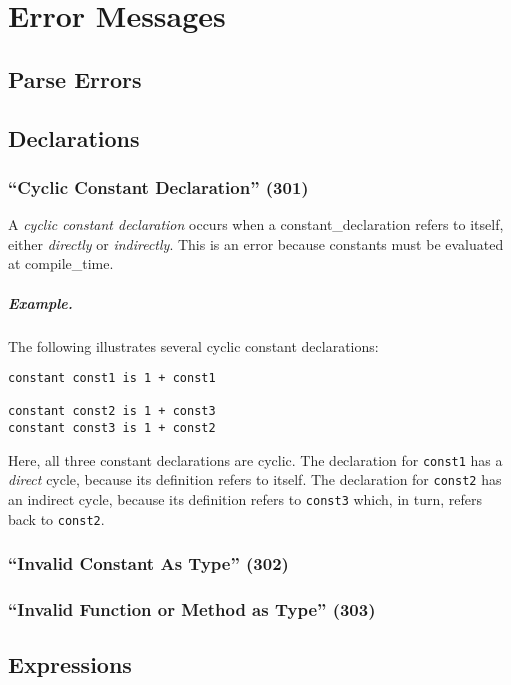 \chapter{Error Messages}

\section{Parse Errors}

\section{Declarations}

\subsection{``Cyclic Constant Declaration'' (301)}

A {\em cyclic constant declaration} occurs when a \gls{constant_declaration} refers to itself, either {\em directly} or {\em indirectly}.  This is an error because constants must be evaluated at \gls{compile_time}.

\paragraph{Example.}  The following illustrates several cyclic constant declarations:

\begin{lstlisting}
constant const1 is 1 + const1

constant const2 is 1 + const3
constant const3 is 1 + const2
\end{lstlisting}
Here, all three constant declarations are cyclic.  The declaration for \lstinline{const1} has a {\em direct} cycle, because its definition refers to itself.  The declaration for \lstinline{const2} has an indirect cycle, because its definition refers to \lstinline{const3} which, in turn, refers back to \lstinline{const2}.

\subsection{``Invalid Constant As Type'' (302)}

\subsection{``Invalid Function or Method as Type'' (303)}

\section{Expressions}
